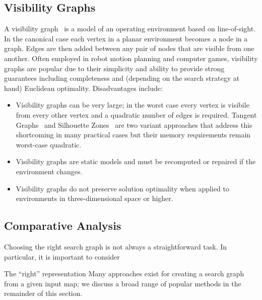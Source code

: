 \subsection{Visibility Graphs}
\label{cha::lit::graphs::vis}
A visibility graph~\citep{lozanoperez79} is a model of an operating environment based on
line-of-sight.  In the canonical case each vertex in a planar environment
becomes a node in a graph. Edges are then added between any pair of nodes that
are visible from one another.  Often employed in robot
motion planning and computer games, visibility graphs are popular due to their 
simplicity and ability to provide strong guarantees including completeness and 
(depending on the search strategy at hand) Euclidean optimality. Disadvantages 
include:
\begin{itemize}
\item Visibility graphs can be very large; in the worst case every
vertex is visibile from every other vertex and a quadratic number
of edges is required. Tangent Graphs~\citep{liu92} and Silhouette Zones~\citep{young01b}
are two variant approaches that address this shortcoming in many practical
cases but their memory requirements remain worst-case quadratic.
\item Visibility graphs are static models and must be recomputed or 
repaired if the environment changes.
\item Visibility graphs do not preserve solution optimality when applied
to environments in three-dimensional space or higher.
\end{itemize}

\subsection{Comparative Analysis}
\label{cha::lit::graphs::analysis}
Choosing the right search graph is not always a straightforward task.
In particular, it is important to consider 


%
%


The ``right'' representation 
Many approaches exist for creating a search graph from a given input map; we
discuss a broad range of popular methods in the remainder of this section.
\\ \newline


